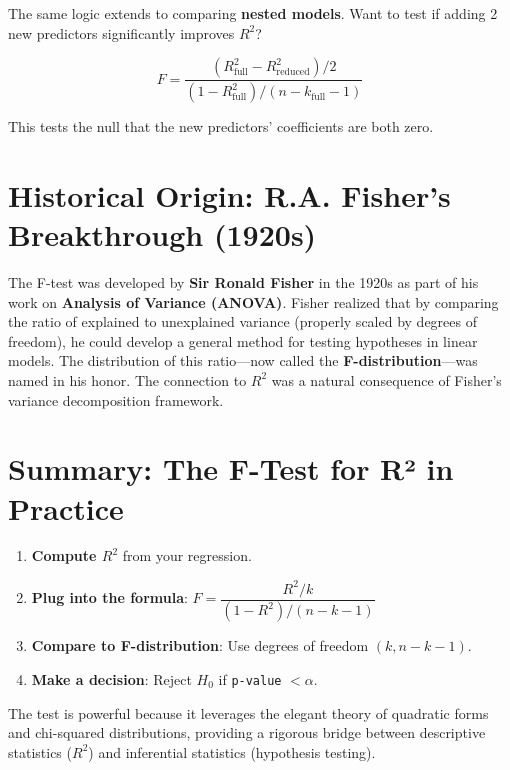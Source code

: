 \documentclass{article}
\begin{document}
The same logic extends to comparing \textbf{nested models}. Want to test if adding 2 new predictors significantly improves $R^2$?

\begin{equation}
    F = \frac{(R^2_{\text{full}} - R^2_{\text{reduced}})/2}{(1 - R^2_{\text{full}})/(n - k_{\text{full}} - 1)}
\end{equation}

This tests the null that the new predictors' coefficients are both zero.

\section{Historical Origin: R.A. Fisher's Breakthrough (1920s)}

The F-test was developed by \textbf{Sir Ronald Fisher} in the 1920s as part of his work on \textbf{Analysis of Variance (ANOVA)}. Fisher realized that by comparing the ratio of explained to unexplained variance (properly scaled by degrees of freedom), he could develop a general method for testing hypotheses in linear models. The distribution of this ratio—now called the \textbf{F-distribution}—was named in his honor. The connection to $R^2$ was a natural consequence of Fisher's variance decomposition framework.

\section{Summary: The F-Test for R² in Practice}

\begin{enumerate}
    \item \textbf{Compute $R^2$} from your regression.
    \item \textbf{Plug into the formula}: $F = \dfrac{R^2/k}{(1-R^2)/(n-k-1)}$
    \item \textbf{Compare to F-distribution}: Use degrees of freedom $(k, n-k-1)$.
    \item \textbf{Make a decision}: Reject $H_0$ if \texttt{p-value} $< \alpha$.
\end{enumerate}

The test is powerful because it leverages the elegant theory of quadratic forms and chi-squared distributions, providing a rigorous bridge between descriptive statistics ($R^2$) and inferential statistics (hypothesis testing).
\end{document}
